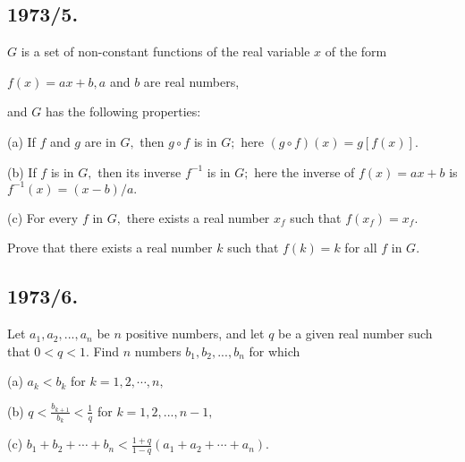 \documentclass[12pt,thmsa]{article}
\begin{document}
\subsection{1973/5.}

$G$ is a set of non-constant functions of the real variable $x$ of the form

\begin{center}
$f(x)=ax+b,a$ and $b$ are real numbers,
\end{center}

and $G$ has the following properties:

(a) If $f$ and $g$ are in $G,$ then $g\circ f$ is in $G;$ here $(g\circ
f)(x)=g[f(x)].$

(b) If $f$ is in $G,$ then its inverse $f^{-1}$  is in $G;$ here the inverse
of $f(x)=ax+b$ is $f^{-1}(x)=(x-b)/a.$

(c) For every $f$ in $G,$ there exists a real number $x_{f}$ such that $%
f(x_{f})=x_{f}.$

Prove that there exists a real number $k$ such that $f(k)=k$ for all $f$ in $%
G.$

\subsection{1973/6.}

Let $a_{1},a_{2},...,a_{n}$ be $n$ positive numbers, and let $q$ be a given
real number such that $0<q<1.$ Find $n$ numbers $b_{1},b_{2},...,b_{n}$ for
which

(a) $a_{k}<b_{k}$ for $k=1,2,\cdots ,n,$

(b) $q<\frac{b_{k+1}}{b_{k}}<\frac{1}{q}$ for $k=1,2,...,n-1,$

(c) $b_{1}+b_{2}+\cdots +b_{n}<\frac{1+q}{1-q}(a_{1}+a_{2}+\cdots +a_{n}).$
\end{document}
